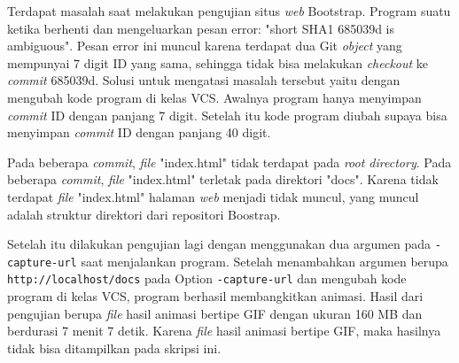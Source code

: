 \begin{enumerate}


Terdapat masalah saat melakukan pengujian situs \textit{web} Bootstrap. Program suatu ketika berhenti dan mengeluarkan pesan error: "short SHA1 685039d is ambiguous". Pesan error ini muncul karena terdapat dua Git \textit{object} yang mempunyai 7 digit ID yang sama, sehingga tidak bisa melakukan \textit{checkout} ke \textit{commit} 685039d. Solusi untuk mengatasi masalah tersebut yaitu dengan mengubah kode program di kelas VCS. Awalnya program hanya menyimpan \textit{commit} ID dengan panjang 7 digit. Setelah itu kode program diubah supaya bisa menyimpan \textit{commit} ID dengan panjang 40 digit.

Pada beberapa \textit{commit}, \textit{file} "index.html" tidak terdapat pada \textit{root directory}. Pada beberapa \textit{commit}, \textit{file} "index.html" terletak pada direktori "docs". Karena tidak terdapat \textit{file} "index.html" halaman \textit{web} menjadi tidak muncul, yang muncul adalah struktur direktori dari repositori Boostrap. 

Setelah itu dilakukan pengujian lagi dengan menggunakan dua argumen pada \texttt{-capture-url}  saat menjalankan program. Setelah menambahkan argumen berupa \texttt{http://localhost/docs} pada Option \texttt{-capture-url} dan mengubah kode program di kelas VCS, program berhasil membangkitkan animasi. Hasil dari pengujian berupa \textit{file} hasil animasi bertipe GIF dengan ukuran 160 MB dan berdurasi 7 menit 7 detik. Karena \textit{file} hasil animasi bertipe GIF, maka hasilnya tidak bisa ditampilkan pada skripsi ini.



\end{enumerate}
